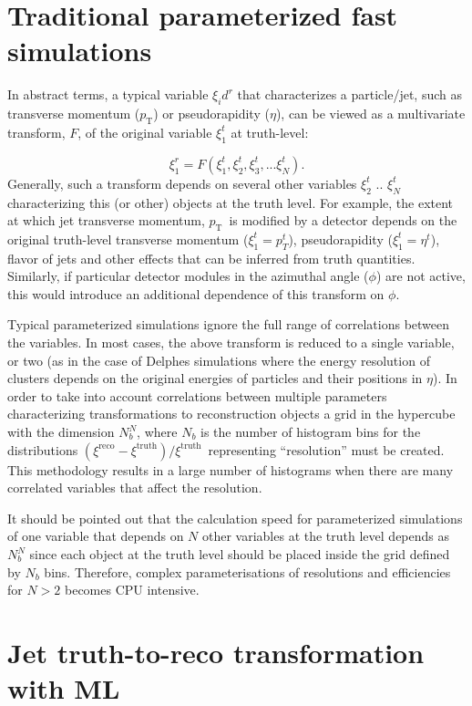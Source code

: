 \documentclass[showpacs,showkeys,preprint,prd,nofootinbib,linenumbers,12pt,superscriptaddress]{revtex4-1}
\def\pt{\ensuremath{p_{\mathrm{T}}}}
\def\genRes{\ensuremath{(\xi^{\mathrm{reco}}-\xi^{\mathrm{truth}})/\xi^{\mathrm{truth}}}}
\begin{document}
\section{Traditional parameterized fast simulations}

In abstract terms, a typical variable $\xi_id^r$ that characterizes a particle/jet, such as transverse momentum (\pt) or pseudorapidity ($\eta$), can be viewed as a multivariate transform, $F$, of the original variable $\xi_1^t$ at truth-level:

$$
\xi_1^r = F (\xi_1^t, \xi_2^t, \xi_3^t, ...\xi_N^t).
$$
Generally, such a transform  depends on several other variables $\xi_2^t$ ..  $\xi_N^t$ characterizing this (or other) objects at the truth level. For example, the extent at which jet transverse momentum, \pt\ is modified by a detector depends on the original truth-level transverse momentum ($\xi_1^t=p_T^t$), pseudorapidity ($\xi_1^t=\eta^t$), flavor of jets and other effects that can be inferred from truth quantities. Similarly, if particular detector modules in the azimuthal angle ($\phi$) are not active, this would introduce an additional dependence of this transform on $\phi$.

Typical parameterized simulations ignore the full range of correlations between the variables. In most cases, the above transform is reduced to a single variable, or two (as in the case of Delphes simulations where the energy resolution of clusters depends on the original energies of particles and their positions in $\eta$). In order to take into account correlations between multiple parameters characterizing transformations to reconstruction objects a grid in the hypercube with the dimension $N_b^N$, where $N_b$ is the number of histogram bins for the distributions \genRes\ representing ``resolution'' must be created. This methodology results in a large number of histograms when there are many correlated variables that affect the resolution.

It should be pointed out that the calculation speed for parameterized simulations of one variable that depends on $N$ other variables at the truth level depends  as $N_b^N$ since each object at the truth level should be placed inside the grid defined by $N_b$ bins. Therefore, complex parameterisations of resolutions and efficiencies for $N>2$ becomes CPU intensive. 

\section{Jet truth-to-reco transformation with ML}
\end{document}
